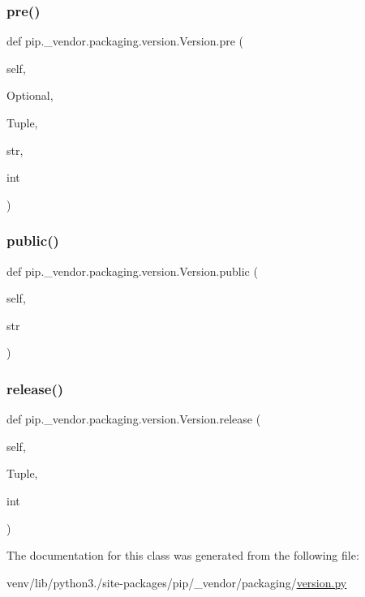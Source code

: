 \subsubsection{\texorpdfstring{pre()}{pre()}}
{\footnotesize\ttfamily def pip.\+\_\+vendor.\+packaging.\+version.\+Version.\+pre (\begin{DoxyParamCaption}\item[{}]{self,  }\item[{}]{Optional,  }\item[{}]{Tuple,  }\item[{}]{str,  }\item[{}]{int }\end{DoxyParamCaption})}

\mbox{\label{classpip_1_1__vendor_1_1packaging_1_1version_1_1Version_a604d586e6fc883bd9bf40bfe5fd8271e}} 
\subsubsection{\texorpdfstring{public()}{public()}}
{\footnotesize\ttfamily def pip.\+\_\+vendor.\+packaging.\+version.\+Version.\+public (\begin{DoxyParamCaption}\item[{}]{self,  }\item[{}]{str }\end{DoxyParamCaption})}

\mbox{\label{classpip_1_1__vendor_1_1packaging_1_1version_1_1Version_a9a7eebbcea14e5ba39b53fe22e970e53}} 
\subsubsection{\texorpdfstring{release()}{release()}}
{\footnotesize\ttfamily def pip.\+\_\+vendor.\+packaging.\+version.\+Version.\+release (\begin{DoxyParamCaption}\item[{}]{self,  }\item[{}]{Tuple,  }\item[{}]{int }\end{DoxyParamCaption})}



The documentation for this class was generated from the following file\+:\begin{DoxyCompactItemize}
\item 
venv/lib/python3./site-\/packages/pip/\+\_\+vendor/packaging/\hyperlink{pip_2__vendor_2packaging_2version_8py}{version.\+py}\end{DoxyCompactItemize}
